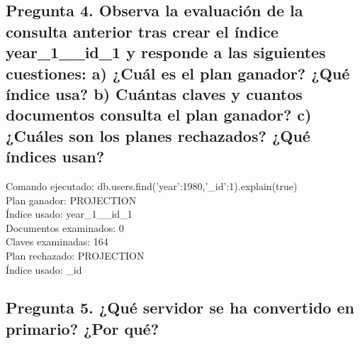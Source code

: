 \documentclass{article}
\begin{document}
    \subsection{Pregunta 4. Observa la evaluación de la consulta anterior tras crear el índice year\_1\_\_id\_1 y responde a las siguientes cuestiones: a) ¿Cuál es el plan ganador? ¿Qué índice usa? b) Cuántas claves y cuantos documentos consulta el plan ganador? c) ¿Cuáles son los planes rechazados? ¿Qué índices usan?} 
    Comando ejecutado: db.users.find({'year':1980},{'\_id':1}).explain(true) \\
    Plan ganador: PROJECTION \\
    Índice usado: year\_1\_\_id\_1 \\
    Documentos examinados: 0 \\
    Claves examinadas: 164 \\
    Plan rechazado: PROJECTION \\
    Índice usado: \_id \\
   \subsection{Pregunta 5. ¿Qué servidor se ha convertido en primario? ¿Por qué?} 
   
\end{document}
